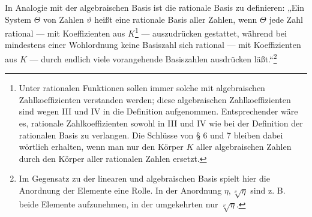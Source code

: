 \documentclass[11pt]{article}
\begin{document}
In Analogie mit der algebraischen Basis ist die rationale Basis zu definieren:
„Ein System $\Theta$ von Zahlen $\vartheta$ heißt eine rationale Basis aller
Zahlen, wenn $\Theta$ jede Zahl rational --- mit Koeffizienten aus
$K$\footnote{Unter rationalen Funktionen sollen immer solche mit algebraischen
Zahlkoeffizienten verstanden werden; diese algebraischen Zahlkoeffizienten sind
wegen III und IV in die Definition aufgenommen. Entsprechender wäre es,
rationale Zahlkoeffizienten sowohl in III und IV wie bei der Definition der
rationalen Basis zu verlangen. Die Schlüsse von § 6 und 7 bleiben dabei wörtlich
erhalten, wenn man nur den Körper $K$ aller algebraischen Zahlen durch den
Körper aller rationalen Zahlen ersetzt.} --- auszudrücken gestattet, während
bei mindestens einer Wohlordnung keine Basiszahl sich rational --- mit
Koeffizienten aus $K$ --- durch endlich viele vorangehende Basiszahlen
ausdrücken läßt.“\footnote{Im Gegensatz zu der linearen und algebraischen Basis
spielt hier die Anordnung der Elemente eine Rolle. In der Anordnung
$\eta,\sqrt[\nu]{\eta}$ sind z. B. beide Elemente aufzunehmen, in der umgekehrten
nur $\sqrt[\nu]{\eta}$.}
\end{document}
